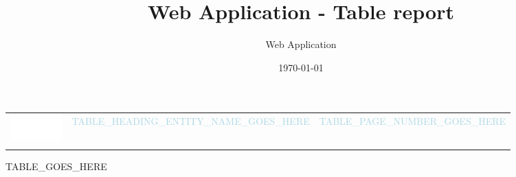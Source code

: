 \documentclass{article}
\title{Web Application - Table report}
\author{Web Application}
\date{\today}
\begin{document}
\pagestyle{fancyplain}
\fancyhf{}
\rhead{ \fancyplain{}{\today} }
\rfoot{ \fancyplain{}{\thepage} }

\sffamily


\noindent

\begin{longtable}{ L{20mm} C{110mm} C{30mm} }
  \textcolor{white}{\includegraphics[width=20mm]{logo}} &
  \textcolor{lightblue}{\Huge{TABLE_HEADING_ENTITY_NAME_GOES_HERE}} &
  \textcolor{lightblue}{TABLE_PAGE_NUMBER_GOES_HERE} \\
   &  & \\
\end{longtable}

TABLE_GOES_HERE
\end{document}
